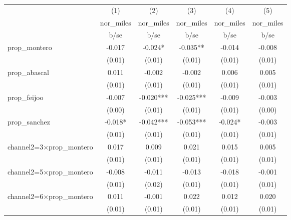 \begin{tabular}{l*{5}{c}}
\toprule
                    &\multicolumn{1}{c}{(1)}&\multicolumn{1}{c}{(2)}&\multicolumn{1}{c}{(3)}&\multicolumn{1}{c}{(4)}&\multicolumn{1}{c}{(5)}\\
                    &\multicolumn{1}{c}{nor\_miles}&\multicolumn{1}{c}{nor\_miles}&\multicolumn{1}{c}{nor\_miles}&\multicolumn{1}{c}{nor\_miles}&\multicolumn{1}{c}{nor\_miles}\\
                    &        b/se   &        b/se   &        b/se   &        b/se   &        b/se   \\
\midrule
prop\_montero        &      -0.017   &      -0.024*  &      -0.035** &      -0.014   &      -0.008   \\
                    &      (0.01)   &      (0.01)   &      (0.01)   &      (0.01)   &      (0.01)   \\
prop\_abascal        &       0.011   &      -0.002   &      -0.002   &       0.006   &       0.005   \\
                    &      (0.01)   &      (0.01)   &      (0.01)   &      (0.01)   &      (0.01)   \\
prop\_feijoo         &      -0.007   &      -0.020***&      -0.025***&      -0.009   &      -0.003   \\
                    &      (0.00)   &      (0.01)   &      (0.01)   &      (0.01)   &      (0.00)   \\
prop\_sanchez        &      -0.018*  &      -0.042***&      -0.053***&      -0.024*  &      -0.003   \\
                    &      (0.01)   &      (0.01)   &      (0.01)   &      (0.01)   &      (0.01)   \\
channel2=3$\times$prop\_montero&       0.017   &       0.009   &       0.021   &       0.015   &       0.005   \\
                    &      (0.01)   &      (0.01)   &      (0.01)   &      (0.01)   &      (0.01)   \\
channel2=5$\times$prop\_montero&      -0.008   &      -0.011   &      -0.013   &      -0.018   &      -0.001   \\
                    &      (0.01)   &      (0.02)   &      (0.01)   &      (0.01)   &      (0.01)   \\
channel2=6$\times$prop\_montero&       0.011   &      -0.001   &       0.022   &       0.012   &       0.020   \\
                    &      (0.01)   &      (0.01)   &      (0.01)   &      (0.01)   &      (0.01)   \\

\end{tabular}
